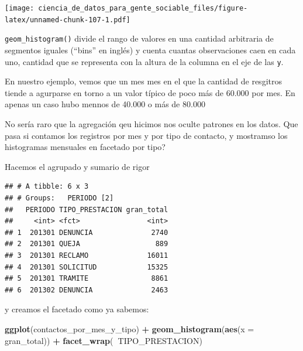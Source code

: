 \documentclass[spanish,]{book}
\newenvironment{Shaded}{\begin{snugshade}}{\end{snugshade}}
\newcommand{\DataTypeTok}[1]{\textcolor[rgb]{0.13,0.29,0.53}{#1}}
\newcommand{\KeywordTok}[1]{\textcolor[rgb]{0.13,0.29,0.53}{\textbf{#1}}}
\newcommand{\NormalTok}[1]{#1}
\newcommand{\OperatorTok}[1]{\textcolor[rgb]{0.81,0.36,0.00}{\textbf{#1}}}
\newcommand{\StringTok}[1]{\textcolor[rgb]{0.31,0.60,0.02}{#1}}
\begin{document}
\texttt{[image: ciencia\_de\_datos\_para\_gente\_sociable\_files/figure-latex/unnamed-chunk-107-1.pdf]}

\texttt{geom\_histogram()} divide el rango de valores en una cantidad arbitraria de segmentos iguales (``bins'' en inglés) y cuenta cuantas observaciones caen en cada uno, cantidad que se representa con la altura de la columna en el eje de las \texttt{y}.

En nuestro ejemplo, vemos que un mes mes en el que la cantidad de resgitros tiende a agurparse en torno a un valor típico de poco más de 60.000 por mes. En apenas un caso hubo mennos de 40.000 o más de 80.000

No sería raro que la agregación qeu hicimos nos oculte patrones en los datos. Que pasa si contamos los registros por mes y por tipo de contacto, y mostramso los histogramas mensuales en facetado por tipo?

Hacemos el agrupado y sumario de rigor

\begin{Shaded}
\end{Shaded}

\begin{verbatim}
## # A tibble: 6 x 3
## # Groups:   PERIODO [2]
##   PERIODO TIPO_PRESTACION gran_total
##     <int> <fct>                <int>
## 1  201301 DENUNCIA              2740
## 2  201301 QUEJA                  889
## 3  201301 RECLAMO              16011
## 4  201301 SOLICITUD            15325
## 5  201301 TRAMITE               8861
## 6  201302 DENUNCIA              2463
\end{verbatim}

y creamos el facetado como ya sabemos:

\begin{Shaded}
\begin{Highlighting}[]
\KeywordTok{ggplot}\NormalTok{(contactos_por_mes_y_tipo) }\OperatorTok{+}\StringTok{ }
\StringTok{    }\KeywordTok{geom_histogram}\NormalTok{(}\KeywordTok{aes}\NormalTok{(}\DataTypeTok{x =}\NormalTok{ gran_total)) }\OperatorTok{+}
\StringTok{    }\KeywordTok{facet_wrap}\NormalTok{(}\OperatorTok{~}\NormalTok{TIPO_PRESTACION)}
\end{Highlighting}
\end{Shaded}
\end{document}
